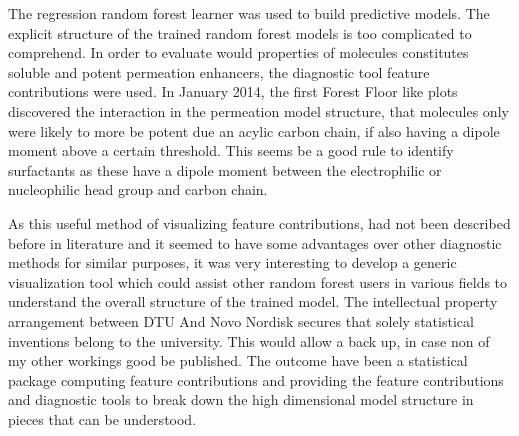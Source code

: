 The regression random forest learner was used to build predictive models. The explicit structure of the trained random forest models is too complicated to comprehend. In order to evaluate would properties of molecules constitutes soluble and potent permeation enhancers, the diagnostic tool feature contributions were used. In January 2014, the first Forest Floor like plots discovered the interaction in the permeation model structure, that molecules only were likely to more be potent due an acylic carbon chain, if also having a dipole moment above a certain threshold. This seems be a good rule to identify surfactants as these have a dipole moment between the electrophilic or nucleophilic head group and carbon chain.

As this useful method of visualizing feature contributions, had not been described before in literature and it seemed to have some advantages over other diagnostic methods for similar purposes, it was very interesting to develop a generic visualization tool which could assist other random forest users in various fields to understand the overall structure of the trained model. The intellectual property arrangement between DTU And Novo Nordisk secures that solely statistical inventions belong to the university. This would allow a back up, in case non of my other workings good be published. The outcome have been a statistical package computing feature contributions and providing the feature contributions and diagnostic tools to break down the high dimensional model structure in pieces that can be understood.
